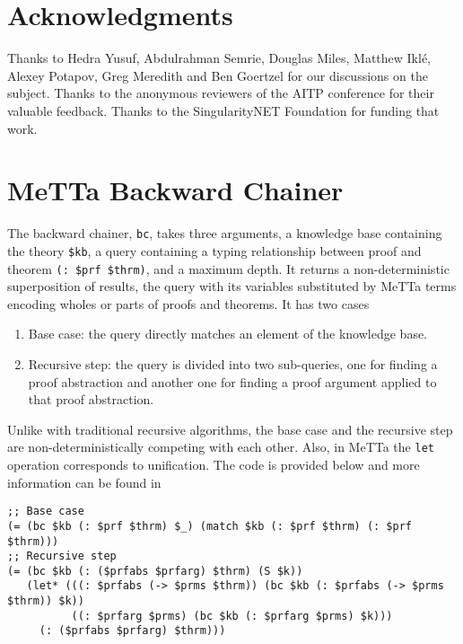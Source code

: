 \documentclass{easychair}
\begin{document}

\section{Acknowledgments}

Thanks to Hedra Yusuf, Abdulrahman Semrie, Douglas Miles, Matthew
Ikl\'e, Alexey Potapov, Greg Meredith and Ben Goertzel for our
discussions on the subject.  Thanks to the anonymous reviewers of the
AITP conference for their valuable feedback.  Thanks to the
SingularityNET Foundation for funding that work.


\newpage


\label{sect:bib}
%
%
%


\newpage

\appendix
\section{MeTTa Backward Chainer}
\label{app:metta-backward-chainer}

The backward chainer, \texttt{bc}, takes three arguments, a knowledge
base containing the theory \texttt{\$kb}, a query containing a typing
relationship between proof and theorem \texttt{(: \$prf \$thrm)}, and
a maximum depth.  It returns a non-deterministic superposition of
results, the query with its variables substituted by MeTTa terms
encoding wholes or parts of proofs and theorems.  It has two cases
\begin{enumerate}
\item Base case: the query directly matches an element of the
  knowledge base.
\item Recursive step: the query is divided into two sub-queries, one
  for finding a proof abstraction and another one for finding a proof
  argument applied to that proof abstraction.
\end{enumerate}
Unlike with traditional recursive algorithms, the base case and the
recursive step are non-deterministically competing with each other.
Also, in MeTTa the \texttt{let} operation corresponds to unification.
The code is provided below and more information can be found
in~\cite{Geisweiller2024ICM} \small{
\begin{verbatim}
;; Base case
(= (bc $kb (: $prf $thrm) $_) (match $kb (: $prf $thrm) (: $prf $thrm)))
;; Recursive step
(= (bc $kb (: ($prfabs $prfarg) $thrm) (S $k))
   (let* (((: $prfabs (-> $prms $thrm)) (bc $kb (: $prfabs (-> $prms $thrm)) $k))
          ((: $prfarg $prms) (bc $kb (: $prfarg $prms) $k)))
     (: ($prfabs $prfarg) $thrm)))
\end{verbatim}
}
\end{document}
